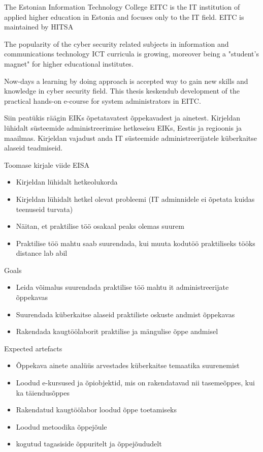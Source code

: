 The Estonian Information Technology College \gls{EITC} is the IT institution of applied higher education in Estonia and focuses only to the IT field.  \cite{EITC} \gls{EITC} is maintained by \gls{HITSA}

The popularity of the cyber security related subjects in information and communications technology \gls{ICT} curricula is growing, moreover being a "student's magnet" for higher educational institutes.\citep{CyberIsHot}

Now-days a learning by doing approach is accepted way to gain new skills and knowledge in cyber security field. This thesis keskendub development of the practical hands-on e-course for system administrators in \gls{EITC}.


  


Siin peatükis räägin EIKs õpetatavatest õppekavadest ja ainetest. Kirjeldan lühidalt süsteemide administreerimise hetkeseisu EIKs, Eestis ja regioonis ja maailmas. Kirjeldan vajadust anda IT süsteemide administreerijatele küberkaitse alaseid teadmiseid.





Toomase kirjale viide \gls{EISA}


\begin{itemize}
	\item Kirjeldan lühidalt hetkeolukorda
	\item Kirjeldan lühidalt hetkel olevat probleemi (IT adminnidele ei õpetata kuidas teenuseid turvata)
	\item Näitan, et praktilise töö osakaal peaks olemas suurem
	\item Praktilise töö mahtu saab suurendada, kui muuta kodutöö praktiliseks tööks distance lab abil
	
\end{itemize}

Goals
\begin{itemize}
	\item Leida võimalus suurendada praktilise töö mahtu it administreerijate õppekavas
	\item Suurendada küberkaitse alaseid praktiliste oskuste andmist õppekavas
	\item Rakendada kaugtöölaborit praktilise ja mängulise õppe andmisel
\end{itemize}


Expected artefacts
\begin{itemize}
	\item Õppekava ainete analüüs arvestades küberkaitse temaatika suurenemist
	\item Loodud e-kursused ja õpiobjektid, mis on rakendatavad nii tasemeõppes, kui ka täiendusõppes
	\item Rakendatud kaugtöölabor loodud õppe toetamiseks
	\item Loodud metoodika õppejõule
	\item kogutud tagasiside õppuritelt ja õppejõududelt
\end{itemize}

